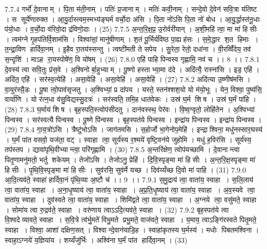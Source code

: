 7.7.4
गर्भो॑ दे॒वानाम् । पि॒ता म॑ती॒नाम् । पतिः॑ प्र॒जानाम् । मतिः॑ कवी॒नाम् । सन्दे॒वो दे॒वेन॑ सवि॒त्रा य॑तिष्ट । स सूर्ये॑णारुक्त । आ॒यु॒र्दास्त्वम॒स्मभ्य॑ङ्घर्म वर्चो॒दा अ॑सि । पि॒ता नो॑ऽसि पि॒ता नो॑ बोध । आ॒यु॒र्द्धास्त॑नू॒धाः प॑यो॒धाः । व॒र्चो॒दा व॑रिवो॒दा द्र॑विणो॒दाः । (25)
7.7.5
अ॒न्त॒रि॒क्ष॒प्र॒ उ॒रोर्वरी॑यान् । अ॒शी॒महि॑ त्वा॒ मा मा॑ हिसीः । त्वम॑ग्ने गृ॒हप॑तिर्वि॒शाम॑सि । विश्वा॑सां॒ मानु॑षीणाम् । श॒तं पू॒र्भिर्य॑विष्ठ पा॒ह्यह॑सः । स॒मे॒द्धार॑ श॒त हिमाः । त॒न्द्रा॒विण॑ हार्दिवा॒नम् । इ॒हैव रा॒तय॑स्सन्तु । त्वष्टी॑मती ते सपेय । सु॒रेता॒ रेतो॒ दधा॑ना । वी॒रव्विँ॑देय॒ तव॑ स॒न्दृशि॑ । माऽह रा॒यस्पोषे॑ण॒ वि यो॑षम् । (26)
7.8.0
एहि॑ पाहि पिन्वस्व गृह्णामि॒ नव॑ च ।। 8 ।।
7.8.1
दे॒वस्य॑ त्वा सवि॒तुः प्र॑स॒वे । अ॒श्विनोर्बा॒हुभ्याम् । पू॒ष्णो हस्ताभ्या॒मा द॑दे । अदि॑त्यै॒ रास्ना॑सि । इड॒ एहि॑ । अदि॑त॒ एहि॑ । सर॑स्व॒त्येहि॑ । असा॒वेहि॑ । असा॒वेहि॑ । असा॒वेहि॑ । (27)
7.8.2
अदि॑त्या उ॒ष्णीष॑मसि । वा॒युर॑स्यै़॒डः । पू॒षा त्वो॒पाव॑सृजतु । अ॒श्विभ्यां॒ प्र दा॑पय । यस्ते॒ स्तन॑श्शश॒यो यो म॑यो॒भूः । येन॒ विश्वा॒ पुष्य॑सि॒ वार्या॑णि । यो र॑त्न॒धा व॑सु॒विद्यस्सु॒दत्रः॑ । सर॑स्वति॒ तमि॒ह धात॑वेकः । उस्र॑ घ॒र्म शि॑ष । उस्र॑ घ॒र्मं पा॑हि । (28)
7.8.3
घ॒र्माय॑ शिष । बृह॒स्पति॒स्त्वोप॑सीदतु । दान॑वस्स्थ॒ पेर॑वः । वि॒ष्व॒ग्वृतो॒ लोहि॑तेन । अ॒श्विभ्यां पिन्वस्व । सर॑स्वत्यै पिन्वस्व । पू॒ष्णे पि॑न्वस्व । बृह॒स्पत॑ये पिन्वस्व । इन्द्रा॑य पिन्वस्व । इन्द्रा॑य पिन्वस्व । (29)
7.8.4
गा॒य॒त्रो॑ऽसि । त्रैष्टु॑भोऽसि । जाग॑तमसि । स॒होर्जो भा॒गेनोप॒मेहि॑ । इन्द्राश्विना॒ मधु॑नस्सार॒घस्य॑ । घ॒र्मं पा॑त वसवो॒ यज॑ता॒ वट् । स्वाहा त्वा॒ सूर्य॑स्य र॒श्मये॑ वृष्टि॒वन॑ये जुहोमि । मधु॑ ह॒विर॑सि । सूर्य॑स्य॒ तप॑स्तप । द्यावा॑पृथि॒वीभ्यान्त्वा॒ परि॑गृह्णामि । (30)
7.8.5
अ॒न्तरि॑क्षेण॒ त्वोप॑यच्छामि । दे॒वानान्त्वा पितृ॒णामनु॑मतो॒ भर्तु॑ शकेयम् । तेजो॑ऽसि । तेजोऽनु॒ प्रेहि॑ । दि॒वि॒स्पृङ्मा मा॑ हिसीः । अ॒न्त॒रि॒क्ष॒स्पृङ्मा मा॑ हिसीः । पृ॒थि॒वि॒स्पृङ्मा मा॑ हिसीः । सुव॑रसि॒ सुव॑र्मे यच्छ । दिव॑य्यँच्छ दि॒वो मा॑ पाहि । (31)
7.9.0
आ॒दि॒त्यव॑ते॒ स्वाहा॑ हार्दिवा॒नं पृ॑थि॒व्या अ॒ष्टौ च॑ ।। 9 ।।
7.9.1
स॒मु॒द्राय॑ त्वा॒ वाता॑य॒ स्वाहा । स॒लि॒लाय॑ त्वा॒ वाता॑य॒ स्वाहा । अ॒ना॒धृ॒ष्याय॑ त्वा॒ वाता॑य॒ स्वाहा । अ॒प्र॒ति॒धृ॒ष्याय॑ त्वा॒ वाता॑य॒ स्वाहा । अ॒व॒स्यवे त्वा॒ वाता॑य॒ स्वाहा । दुव॑स्वते त्वा॒ वाता॑य॒ स्वाहा । शिमि॑द्वते त्वा॒ वाता॑य॒ स्वाहा । अ॒ग्नये त्वा॒ वसु॑मते॒ स्वाहा । सोमा॑य त्वा रु॒द्रव॑ते॒ स्वाहा । वरु॑णाय त्वाऽऽदि॒त्यव॑ते॒ स्वाहा । (32)
7.9.2
बृह॒स्पत॑ये त्वा वि॒श्वदेव्यावते॒ स्वाहा । स॒वि॒त्रे त्व॑र्भु॒मते॑ विभु॒मते प्रभु॒मते॒ वाज॑वते॒ स्वाहा । य॒माय॒ त्वाऽङ्गि॑रस्वते पितृ॒मते॒ स्वाहा । विश्वा॒ आशा॑ दक्षिण॒सत् । विश्वान्दे॒वान॑याडि॒ह । स्वाहा॑कृतस्य घ॒र्मस्य॑ । मधोः पिबतमश्विना । स्वाहा॒ऽग्नये॑ य॒ज्ञिया॑य । शय्यँजु॑र्भिः । अश्वि॑ना घ॒र्मं पा॑त हार्दिवा॒नम् । (33)
